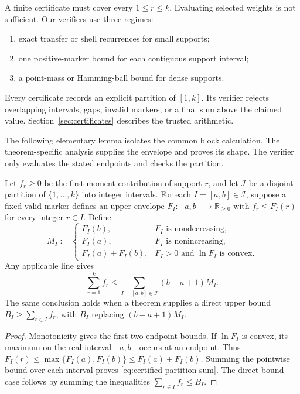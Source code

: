A finite certificate must cover every $1\leq r\leq k$.  Evaluating selected
weights is not sufficient.  Our verifiers use three regimes:

\begin{enumerate}
  \item exact transfer or shell recurrences for small supports;
  \item one positive-marker bound for each contiguous support interval;
  \item a point-mass or Hamming-ball bound for dense supports.
\end{enumerate}

Every certificate records an explicit partition of $[1,k]$.  Its verifier
rejects overlapping intervals, gaps, invalid markers, or a final sum above the
claimed value.  Section~\ref{sec:certificates} describes the trusted
arithmetic.

The following elementary lemma isolates the common block calculation.  The
theorem-specific analysis supplies the envelope and proves its shape.  The
verifier only evaluates the stated endpoints and checks the partition.

\begin{lemma}
\label{lem:certified-support-partition}
Let $f_r\geq0$ be the first-moment contribution of support $r$, and let
$\mathcal I$ be a disjoint partition of $\{1,\ldots,k\}$ into integer
intervals.  For each $I=[a,b]\in\mathcal I$, suppose a fixed valid marker
defines an upper envelope $F_I:[a,b]\to\mathbb R_{\geq0}$ with
$f_r\leq F_I(r)$ for every integer $r\in I$.  Define
\begin{equation}
 M_I:=
 \begin{cases}
  F_I(b),&F_I\text{ is nondecreasing},\\
  F_I(a),&F_I\text{ is nonincreasing},\\
  F_I(a)+F_I(b),&F_I>0\text{ and }\ln F_I\text{ is convex}.
 \end{cases}
 \label{eq:certified-block-endpoint}
\end{equation}
Any applicable line gives
\begin{equation}
 \sum_{r=1}^{k}f_r
 \leq\sum_{I=[a,b]\in\mathcal I}(b-a+1)M_I.
 \label{eq:certified-partition-sum}
\end{equation}
The same conclusion holds when a theorem supplies a direct upper bound
$B_I\geq\sum_{r\in I}f_r$, with $B_I$ replacing $(b-a+1)M_I$.
\end{lemma}

\begin{proof}
Monotonicity gives the first two endpoint bounds.  If $\ln F_I$ is convex,
its maximum on the real interval $[a,b]$ occurs at an endpoint.  Thus
$F_I(r)\leq\max\{F_I(a),F_I(b)\}\leq F_I(a)+F_I(b)$.
Summing the pointwise bound over each interval proves
\eqref{eq:certified-partition-sum}.  The direct-bound case follows by
summing the inequalities $\sum_{r\in I}f_r\leq B_I$.
\end{proof}

